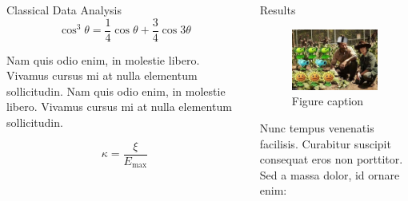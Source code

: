 \documentclass[final]{beamer}
\newlength{\onecolwid}
\newlength{\twocolwid}
\begin{document}
\begin{frame}[t]
\begin{columns}[t]
\begin{column}{\twocolwid}
\begin{columns}[t,totalwidth=\twocolwid]
\begin{column}{\onecolwid}
\begin{block}{Classical Data Analysis}
\begin{equation}
\cos^3 \theta =\frac{1}{4}\cos\theta+\frac{3}{4}\cos 3\theta
\label{eq:refname}
\end{equation}

Nam quis odio enim, in molestie libero. Vivamus cursus mi at nulla elementum sollicitudin. Nam quis odio enim, in molestie libero. Vivamus cursus mi at nulla elementum sollicitudin.

\begin{equation}
\kappa =\frac{\xi}{E_{\mathrm{max}}} %
\end{equation}

\end{block}


\end{column} %

\begin{column}{\onecolwid} %


\begin{block}{Results}

\begin{figure}
\includegraphics[width=0.8\linewidth]{placeholder.jpg}
\caption{Figure caption}
\end{figure}

Nunc tempus venenatis facilisis. Curabitur suscipit consequat eros non porttitor. Sed a massa dolor, id ornare enim:


\end{block}
\end{column}
\end{columns}
\end{column}
\end{columns}
\end{frame}
\end{document}
